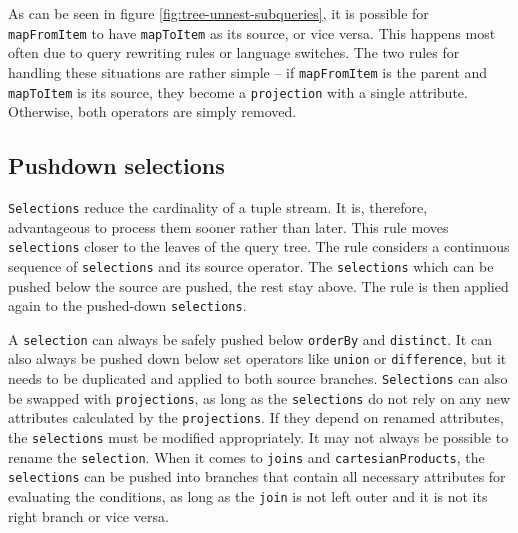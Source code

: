 As can be seen in figure \ref{fig:tree-unnest-subqueries}, it is possible for \texttt{mapFromItem} to have \texttt{mapToItem} as its source, or vice versa. This happens most often due to query rewriting rules or language switches. The two rules for handling these situations are rather simple -- if \texttt{mapFromItem} is the parent and \texttt{mapToItem} is its source, they become a \texttt{projection} with a single attribute. Otherwise, both operators are simply removed.

\subsection{Pushdown selections}

\texttt{Selections} reduce the cardinality of a tuple stream. It is, therefore, advantageous to process them sooner rather than later. This rule moves \texttt{selections} closer to the leaves of the query tree. The rule considers a continuous sequence of \texttt{selections} and its source operator. The \texttt{selections} which can be pushed below the source are pushed, the rest stay above. The rule is then applied again to the pushed-down \texttt{selections}.

A \texttt{selection} can always be safely pushed below \texttt{orderBy} and \texttt{distinct}. It can also always be pushed down below set operators like \texttt{union} or \texttt{difference}, but it needs to be duplicated and applied to both source branches. \texttt{Selections} can also be swapped with \texttt{projections}, as long as the \texttt{selections} do not rely on any new attributes calculated by the \texttt{projections}. If they depend on renamed attributes, the \texttt{selections} must be modified appropriately. It may not always be possible to rename the \texttt{selection}. When it comes to \texttt{joins} and \texttt{cartesianProducts}, the \texttt{selections} can be pushed into branches that contain all necessary attributes for evaluating the conditions, as long as the \texttt{join} is not left outer and it is not its right branch or vice versa.

